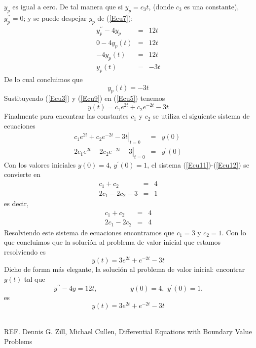 \documentclass[12pt]{article}
\begin{document}
$y_{p}$ es igual a cero. De tal manera que si $y_{p}=c_{3}t$, (donde $c_{3}$ es una constante), $y_{p}^{\prime\prime}=0$; y se 
puede despejar $y_{p}$ de (\ref{Ecu7}):
\begin{eqnarray*}
y_{p}^{\prime\prime}-4y_{p}&=&12t\\
0-4y_{p}(t)&=&12t\\
-4y_{p}(t)&=&12t\\
y_{p}(t)&=&-3t
\label{Ecu8}
\end{eqnarray*}
De lo cual concluimos que
\begin{equation}
y_{p}(t)=-3t
\label{Ecu9}
\end{equation}
Sustituyendo (\ref{Ecu3}) y (\ref{Ecu9}) en (\ref{Ecu5}) tenemos
\begin{equation}
y(t)=c_{1}e^{2t}+c_{2}e^{-2t}-3t
\label{Ecu10}
\end{equation}
Finalmente para encontrar las constantes $c_{1}$ y $c_{2}$ se utiliza el siguiente sistema de 
ecuaciones
\begin{eqnarray}
\left.c_{1}e^{2t}+c_{2}e^{-2t}-3t\right|_{t=0}&=&y(0)\label{Ecu11}\\
\left.2c_{1}e^{2t}-2c_{2}e^{-2t}-3\right|_{t=0}&=&y^{\prime}(0)\label{Ecu12}
\end{eqnarray}
Con los valores iniciales $y(0)=4$, $y^{\prime}(0)=1$, el sistema (\ref{Ecu11})-(\ref{Ecu12}) se 
convierte en
\begin{eqnarray}
c_{1}+c_{2}&=&4\label{Ecu13}\\
2c_{1}-2c_{2}-3&=&1\label{Ecu14}
\end{eqnarray}
es decir,
\begin{eqnarray}
c_{1}+c_{2}&=&4\label{Ecu13}\\
2c_{1}-2c_{2}&=&4\label{Ecu14}
\end{eqnarray}
Resolviendo este sistema de ecuaciones encontramos que $c_{1}=3$ y $c_{2}=1$. Con lo que concluimos 
que la solución al problema de valor inicial que estamos resolviendo es
\begin{equation}
y(t)=3e^{2t}+e^{-2t}-3t
\end{equation}
Dicho de forma más elegante, la solución al problema de valor inicial: encontrar $y(t)$ tal que
\begin{equation}
y^{\prime\prime}-4y=12t,\hspace{2cm}y(0)=4,\,\,y^{\prime}(0)=1.
\label{Ecu15}
\end{equation}
es 
\begin{equation}
y(t)=3e^{2t}+e^{-2t}-3t
\label{Ecu16}
\end{equation}


\ \\
REF. Dennis G. Zill, Michael Cullen, Differential Equations with Boundary Value Problems
\end{document}
